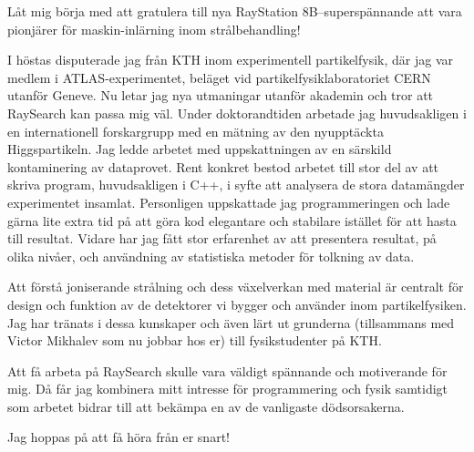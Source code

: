 \documentclass[11pt, a4paper]{../awesome-cv} %
\begin{document}
\sloppy %

\makecvheader %

\makelettertitle %


\begin{cvletter}
\vspace{.2cm}
Låt mig börja med att gratulera till nya RayStation 8B–superspännande att vara pionjärer för maskin-inlärning inom strålbehandling!

I höstas disputerade jag från KTH inom experimentell partikelfysik, där jag var medlem i ATLAS-experimentet, beläget vid partikelfysiklaboratoriet CERN utanför Geneve.
Nu letar jag nya utmaningar utanför akademin och tror att RaySearch kan passa mig väl. 
Under doktorandtiden arbetade jag huvudsakligen i en internationell forskargrupp med en mätning av den nyupptäckta Higgspartikeln. 
Jag ledde arbetet med uppskattningen av en särskild kontaminering av dataprovet.
Rent konkret bestod arbetet till stor del av att skriva program, huvudsakligen i C++, i syfte att analysera de stora datamängder experimentet insamlat.
Personligen uppskattade jag programmeringen och lade gärna lite extra tid på att göra kod elegantare och stabilare istället för att hasta till resultat.
Vidare har jag fått stor erfarenhet av att presentera resultat, på olika nivåer, och användning av statistiska metoder för tolkning av data.

Att förstå joniserande strålning och dess växelverkan med material är centralt för design och funktion av de detektorer vi bygger och använder inom partikelfysiken. 
Jag har tränats i dessa kunskaper och även lärt ut grunderna (tillsammans med Victor Mikhalev som nu jobbar hos er) till fysikstudenter på KTH.

Att få arbeta på RaySearch skulle vara väldigt spännande och motiverande för mig.
Då får jag kombinera mitt intresse för programmering och fysik samtidigt som arbetet bidrar till att bekämpa en av de vanligaste dödsorsakerna.

Jag hoppas på att få höra från er snart!

\end{cvletter}


\makeletterclosing %
\end{document}
